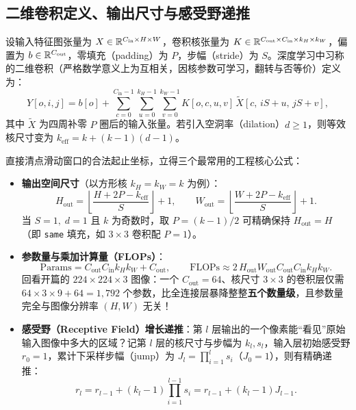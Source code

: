 \subsection{二维卷积定义、输出尺寸与感受野递推}

\begin{defBox}
\begin{definition}[多通道二维卷积层]
设输入特征图张量为 $X \in \mathbb{R}^{C_{\text{in}} \times H \times W}$，卷积核张量为 $K \in \mathbb{R}^{C_{\text{out}} \times C_{\text{in}} \times k_H \times k_W}$，偏置为 $b \in \mathbb{R}^{C_{\text{out}}}$，零填充（padding）为 $P$，步幅（stride）为 $S$。深度学习中习称的二维卷积（严格数学意义上为互相关，因核参数可学习，翻转与否等价）定义为：
\begin{equation}
  Y[o, i, j] = b[o] + \sum_{c=0}^{C_{\text{in}}-1} \sum_{u=0}^{k_H-1} \sum_{v=0}^{k_W-1}
  K[o, c, u, v]\, \tilde{X}\!\left[c,\, i S + u,\, j S + v\right],
  \label{eq:conv2d}
\end{equation}
其中 $\tilde{X}$ 为四周补零 $P$ 圈后的输入张量。若引入空洞率（dilation）$d \ge 1$，则等效核尺寸变为 $k_{\text{eff}} = k + (k - 1)(d - 1)$。
\end{definition}
\end{defBox}

直接清点滑动窗口的合法起止坐标，立得三个最常用的工程核心公式：
\begin{itemize}
  \item \textbf{输出空间尺寸}（以方形核 $k_H = k_W = k$ 为例）：
  \begin{equation}
    H_{\text{out}} = \left\lfloor \frac{H + 2P - k_{\text{eff}}}{S} \right\rfloor + 1, \qquad
    W_{\text{out}} = \left\lfloor \frac{W + 2P - k_{\text{eff}}}{S} \right\rfloor + 1.
    \label{eq:conv-out-size}
  \end{equation}
  当 $S = 1,\; d = 1$ 且 $k$ 为奇数时，取 $P = (k - 1)/2$ 可精确保持 $H_{\text{out}} = H$（即 \texttt{same} 填充，如 $3\times 3$ 卷积配 $P=1$）。
  \item \textbf{参数量与乘加计算量（FLOPs）}：
  \[
    \text{Params} = C_{\text{out}} C_{\text{in}} k_H k_W + C_{\text{out}}, \qquad
    \text{FLOPs} \approx 2\, H_{\text{out}} W_{\text{out}} C_{\text{out}} C_{\text{in}} k_H k_W.
  \]
  回看开篇的 $224 \times 224 \times 3$ 图像：一个 $C_{\text{out}} = 64$、核尺寸 $3\times 3$ 的卷积层仅需 $64 \times 3 \times 9 + 64 = 1{,}792$ 个参数，比全连接层暴降整整\textbf{五个数量级}，且参数量完全与图像分辨率 $(H, W)$ 无关！
  \item \textbf{感受野（Receptive Field）增长递推}：第 $l$ 层输出的一个像素能“看见”原始输入图像中多大的区域？记第 $l$ 层的核尺寸与步幅为 $k_l, s_l$，输入层初始感受野 $r_0 = 1$，累计下采样步幅（jump）为 $J_l = \prod_{i=1}^{l} s_i$（$J_0 = 1$），则有精确递推：
  \begin{equation}
    r_l = r_{l-1} + (k_l - 1)\prod_{i=1}^{l-1} s_i = r_{l-1} + (k_l - 1) J_{l-1}.
    \label{eq:receptive-field}
  \end{equation}
\end{itemize}

